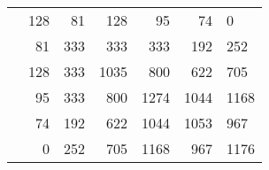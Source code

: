 \begin{tabular}{lrrrrr}
\toprule
{} &   &   &   &   &   &   \\
\midrule
{} &     128 &      81 &     128 &      95 &      74 &       0 \\
 &      81 &     333 &     333 &     333 &     192 &     252 \\
 &     128 &     333 &    1035 &     800 &     622 &     705 \\
 &      95 &     333 &     800 &    1274 &    1044 &    1168 \\
 &      74 &     192 &     622 &    1044 &    1053 &     967 \\
 &       0 &     252 &     705 &    1168 &     967 &    1176 \\
\bottomrule
\end{tabular}
